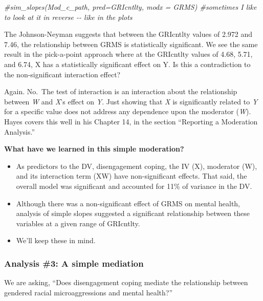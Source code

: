 \documentclass[
  english,
]{book}
\newenvironment{Shaded}{\begin{snugshade}}{\end{snugshade}}
\newcommand{\CommentTok}[1]{\textcolor[rgb]{0.56,0.35,0.01}{\textit{#1}}}
\providecommand{\tightlist}{%
  \setlength{\itemsep}{0pt}\setlength{\parskip}{0pt}}
\begin{document}
\begin{Shaded}
\begin{Highlighting}[]
\CommentTok{\#sim\_slopes(Mod\_c\_path, pred=GRIcntlty, modx = GRMS) \#sometimes I like to look at it in reverse {-}{-} like in the plots}
\end{Highlighting}
\end{Shaded}

The Johnson-Neyman suggests that between the GRIcntlty values of 2.972 and 7.46, the relationship between GRMS is statistically significant. We see the same result in the pick-a-point approach where at the GRIcntlty values of 4.68, 5.71, and 6.74, X has a statistically significant effect on Y. Is this a contradiction to the non-significant interaction effect?

Again. No.~The test of interaction is an interaction about the relationship between \emph{W} and \emph{X}'s effect on \emph{Y}. Just showing that \emph{X} is significantly related to \emph{Y} for a specific value does not address any dependence upon the moderator (\emph{W}). Hayes \citeyearpar{hayes_introduction_2018} covers this well in his Chapter 14, in the section ``Reporting a Moderation Analysis.''

\textbf{What have we learned in this simple moderation?}

\begin{itemize}
\tightlist
\item
  As predictors to the DV, disengagement coping, the IV (X), moderator (W), and its interaction term (XW) have non-significant effects. That said, the overall model was significant and accounted for 11\% of variance in the DV.
\item
  Although there was a non-significant effect of GRMS on mental health, analysis of simple slopes suggested a significant relationship between these variables at a given range of GRIcntlty.
\item
  We'll keep these in mind.
\end{itemize}

\hypertarget{analysis-3-a-simple-mediation}{%
\subsubsection{Analysis \#3: A simple mediation}\label{analysis-3-a-simple-mediation}}

We are asking, ``Does disengagement coping mediate the relationship between gendered racial microaggressions and mental health?''
\end{document}
